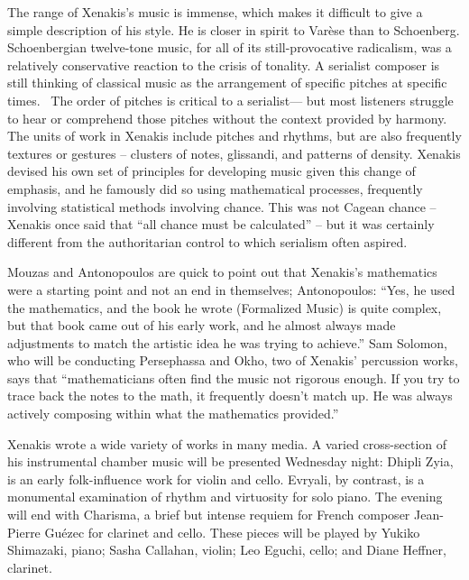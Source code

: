 The range of Xenakis’s music is immense, which makes it difficult to give a simple description of his style. He is closer in spirit to Varèse than to Schoenberg. Schoenbergian twelve-tone music, for all of its still-provocative radicalism, was a relatively conservative reaction to the crisis of tonality. A serialist composer is still thinking of classical music as the arrangement of specific pitches at specific times.  The order of pitches is critical to a serialist— but most listeners struggle to hear or comprehend those pitches without the context provided by harmony. The units of work in Xenakis include pitches and rhythms, but are also frequently textures or gestures -- clusters of notes, glissandi, and patterns of density. Xenakis devised his own set of principles for developing music given this change of emphasis, and he famously did so using mathematical processes, frequently involving statistical methods involving chance. This was not Cagean chance -- Xenakis once said that “all chance must be calculated” -- but it was certainly different from the authoritarian control to which serialism often aspired.

Mouzas and Antonopoulos are quick to point out that Xenakis’s mathematics were a starting point and not an end in themselves; Antonopoulos: “Yes, he used the mathematics, and the book he wrote (Formalized Music) is quite complex, but that book came out of his early work, and he almost always made adjustments to match the artistic idea he was trying to achieve.” Sam Solomon, who will be conducting Persephassa and Okho, two of Xenakis' percussion works, says that “mathematicians often find the music not rigorous enough. If you try to trace back the notes to the math, it frequently doesn't match up. He was always actively composing within what the mathematics provided.”

Xenakis wrote a wide variety of works in many media. A varied cross-section of his instrumental chamber music will be presented Wednesday night: Dhipli Zyia, is an early folk-influence work for violin and cello. Evryali, by contrast, is a monumental examination of rhythm and virtuosity for solo piano. The evening will end with Charisma, a brief but intense requiem for French composer Jean-Pierre Guézec for clarinet and cello. These pieces will be played by Yukiko Shimazaki, piano; Sasha Callahan, violin; Leo Eguchi, cello; and Diane Heffner, clarinet.

